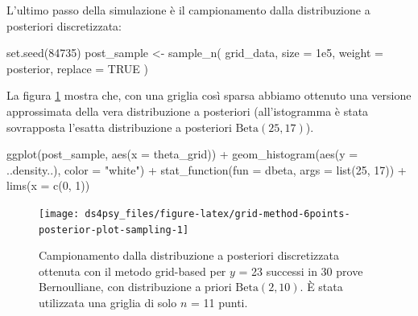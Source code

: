 \documentclass[
  11pt,
]{krantz}
\makeatletter
\newenvironment{Shaded}{\begin{snugshade}}{\end{snugshade}}
\newcommand{\AttributeTok}[1]{\textcolor[rgb]{0.61,0.61,0.61}{#1}}
\newcommand{\ConstantTok}[1]{\textcolor[rgb]{0,0,0}{#1}}
\newcommand{\DecValTok}[1]{\textcolor[rgb]{0.06,0.06,0.06}{#1}}
\newcommand{\FloatTok}[1]{\textcolor[rgb]{0.06,0.06,0.06}{#1}}
\newcommand{\FunctionTok}[1]{\textcolor[rgb]{0,0,0}{#1}}
\newcommand{\NormalTok}[1]{#1}
\newcommand{\OtherTok}[1]{\textcolor[rgb]{0.37,0.37,0.37}{#1}}
\newcommand{\SpecialCharTok}[1]{\textcolor[rgb]{0,0,0}{#1}}
\newcommand{\StringTok}[1]{\textcolor[rgb]{0.5,0.5,0.5}{#1}}
\newenvironment{kframe}{%
\medskip{}
\setlength{\fboxsep}{.8em}
 \def\at@end@of@kframe{}%
 \ifinner\ifhmode%
  \def\at@end@of@kframe{\end{minipage}}%
  \begin{minipage}{\columnwidth}%
 \fi\fi%
 \def\FrameCommand##1{\hskip\@totalleftmargin \hskip-\fboxsep
 \colorbox{shadecolor}{##1}\hskip-\fboxsep
     \hskip-\linewidth \hskip-\@totalleftmargin \hskip\columnwidth}%
 \MakeFramed {\advance\hsize-\width
   \@totalleftmargin\z@ \linewidth\hsize
   \@setminipage}}%
 {\par\unskip\endMakeFramed%
 \at@end@of@kframe}
\renewenvironment{Shaded}{\begin{kframe}}{\end{kframe}}
\theoremstyle{definition}
\theoremstyle{definition}
\theoremstyle{definition}
\theoremstyle{definition}
\theoremstyle{remark}
\makeatother
\begin{document}
L'ultimo passo della simulazione è il campionamento dalla distribuzione a posteriori discretizzata:

\begin{Shaded}
\begin{Highlighting}[]
\FunctionTok{set.seed}\NormalTok{(}\DecValTok{84735}\NormalTok{)}
\NormalTok{post\_sample }\OtherTok{\textless{}{-}} \FunctionTok{sample\_n}\NormalTok{(}
\NormalTok{  grid\_data,}
  \AttributeTok{size =} \FloatTok{1e5}\NormalTok{,}
  \AttributeTok{weight =}\NormalTok{ posterior,}
  \AttributeTok{replace =} \ConstantTok{TRUE}
\NormalTok{)}
\end{Highlighting}
\end{Shaded}

La figura \ref{fig:grid-method-6points-posterior-plot-sampling} mostra che, con una griglia così sparsa abbiamo ottenuto una versione approssimata della vera distribuzione a posteriori (all'istogramma è stata sovrapposta l'esatta distribuzione a posteriori \(\mbox{Beta}(25, 17)\)).

\begin{Shaded}
\begin{Highlighting}[]
\FunctionTok{ggplot}\NormalTok{(post\_sample, }\FunctionTok{aes}\NormalTok{(}\AttributeTok{x =}\NormalTok{ theta\_grid)) }\SpecialCharTok{+}
  \FunctionTok{geom\_histogram}\NormalTok{(}\FunctionTok{aes}\NormalTok{(}\AttributeTok{y =}\NormalTok{ ..density..), }\AttributeTok{color =} \StringTok{"white"}\NormalTok{) }\SpecialCharTok{+}
  \FunctionTok{stat\_function}\NormalTok{(}\AttributeTok{fun =}\NormalTok{ dbeta, }\AttributeTok{args =} \FunctionTok{list}\NormalTok{(}\DecValTok{25}\NormalTok{, }\DecValTok{17}\NormalTok{)) }\SpecialCharTok{+}
  \FunctionTok{lims}\NormalTok{(}\AttributeTok{x =} \FunctionTok{c}\NormalTok{(}\DecValTok{0}\NormalTok{, }\DecValTok{1}\NormalTok{))}
\end{Highlighting}
\end{Shaded}

\begin{figure}[h]

{\centering \texttt{[image: ds4psy\_files/figure-latex/grid-method-6points-posterior-plot-sampling-1]} 

}

\caption{Campionamento dalla  distribuzione a posteriori discretizzata ottenuta con il metodo grid-based per $y$ = 23 successi in 30 prove Bernoulliane, con distribuzione a priori $\mbox{Beta}(2, 10)$. È stata utilizzata una griglia di solo $n$ = 11 punti.}\label{fig:grid-method-6points-posterior-plot-sampling}
\end{figure}
\end{document}
